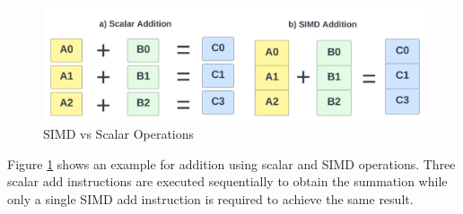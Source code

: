 \begin{figure}[H]
\includegraphics[width=\textwidth]{imgs/simd-add.png}
\caption[SIMD vs Scalar]{SIMD vs Scalar Operations \cite{simdscalar}}\label{fig:simdscalar}
\end{figure}

Figure \ref{fig:simdscalar} shows an example for addition using scalar and SIMD operations. Three scalar add instructions are executed sequentially to obtain the summation while only a single SIMD add instruction is required to achieve the same result.

